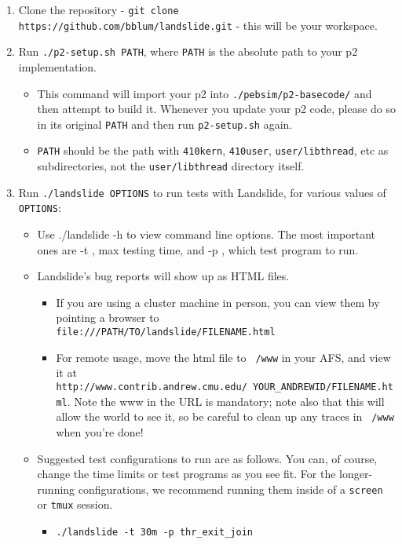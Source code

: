 \documentclass{article}
\begin{document}
\begin{enumerate}
	\item Clone the repository - {\tt git clone https://github.com/bblum/landslide.git} - this will be your workspace.
	\item Run {\tt ./p2-setup.sh PATH}, where {\tt PATH} is the absolute path to your p2 implementation.
		\begin{itemize}
			\item This command will import your p2 into {\tt ./pebsim/p2-basecode/} and then attempt to build it.
				Whenever you update your p2 code, please do so in its original {\tt PATH}
				and then run {\tt p2-setup.sh} again.
			\item {\tt PATH} should be the path with {\tt 410kern}, {\tt 410user}, {\tt user/libthread}, etc as subdirectories, not the {\tt user/libthread} directory itself.
		\end{itemize}
	\item Run {\tt ./landslide OPTIONS} to run tests with Landslide, for various values of {\tt OPTIONS}:
		\begin{itemize}
			\item Use ./landslide -h to view command line options. The most important ones are -t , max testing
time, and -p , which test program to run.
			\item Landslide's bug reports will show up as HTML files.
				\begin{itemize}
					\item If you are using a cluster machine in person, you can view them by pointing a browser to \\
						{\tt file:///PATH/TO/landslide/FILENAME.html}
					\item For remote usage, move the html file to {\tt ~/www} in your AFS, and view it at \\
						{\tt http://www.contrib.andrew.cmu.edu/~YOUR\_ANDREWID/FILENAME.html}.
						Note the www in the URL is mandatory;
						note also that this will allow the world to see it,
						so be careful to clean up any traces in {\tt ~/www} when you're done!
				\end{itemize}
			\item Suggested test configurations to run are as follows.
				You can, of course, change the time limits or test programs as you see fit.
				For the longer-running configurations,
				we recommend running them inside of a {\tt screen} or {\tt tmux} session.
				\begin{itemize}
					\item \texttt{./landslide -t 30m -p thr\_exit\_join}

\end{itemize}
\end{itemize}
\end{enumerate}
\end{document}
